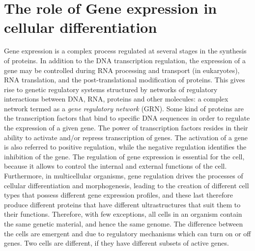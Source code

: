 \section{The role of Gene expression in cellular differentiation}
Gene expression is a complex process regulated at several stages in the synthesis of proteins. In addition to the DNA transcription regulation, the expression of a gene may be controlled during RNA processing and transport (in eukaryotes), RNA translation, and the post-translational modification of proteins. This gives rise to genetic regulatory systems structured by networks of regulatory interactions between DNA, RNA, proteins and other molecules: a complex network termed as a \emph{gene regulatory
network} (GRN). Some kind of proteins are the transcription factors that bind to specific DNA sequences in order to regulate the
expression of a given gene. The power of transcription factors resides in their ability to activate and/or repress transcription of genes. The activation of
a gene is also referred to positive regulation, while the negative regulation
identifies the inhibition of the gene.
The regulation of gene expression is essential for the cell, because it
allows to control the internal and external functions of the cell. Furthermore,
in multicellular organisms, gene regulation drives the processes of cellular
differentiation and morphogenesis, leading to the creation of different cell
types that possess different gene expression profiles, and these last therefore
produce different proteins that have different ultrastructures that suit them
to their functions. Therefore, with few exceptions, all cells in an
organism contain the same genetic material, and hence the same genome. The difference between the cells are emergent and due to regulatory mechanisms which can turn on or off genes. Two cells are different, if they have different subsets of active genes.
